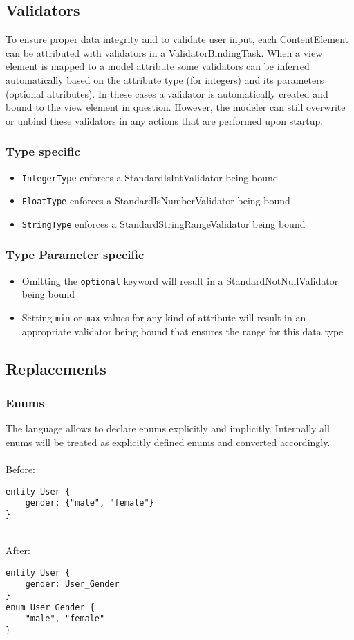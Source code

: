 \subsection{Validators}
To ensure proper data integrity and to validate user input, each ContentElement can be attributed with validators in a ValidatorBindingTask. When a view element is mapped to a model attribute some validators can be inferred automatically based on the attribute type (\eg for integers) and its parameters (\eg optional attributes). In these cases a validator is automatically created and bound to the view element in question. However, the modeler can still overwrite or unbind these validators in any actions that are performed upon startup.

\subsubsection{Type specific}
\begin{itemize}
\item \lstinline!IntegerType! enforces a StandardIsIntValidator being bound
\item \lstinline!FloatType! enforces a StandardIsNumberValidator being bound
\item \lstinline!StringType! enforces a StandardStringRangeValidator being bound
\end{itemize}

\subsubsection{Type Parameter specific}

\begin{itemize}
\item Omitting the \lstinline!optional! keyword will result in a StandardNotNullValidator being bound
\item Setting \lstinline!min! or \lstinline!max! values for any kind of attribute will result in an appropriate validator being bound that ensures the range for this data type
\end{itemize}

\subsection{Replacements}
\subsubsection{Enums}
The \MD language allows to declare enums explicitly and implicitly. Internally all enums will be treated as explicitly defined enums and converted accordingly. \\ \\
Before:
\begin{lstlisting}[language=MD2]
entity User {
	gender: {"male", "female"}
}
\end{lstlisting}
~
\\
After:
\begin{lstlisting}[language=MD2]
entity User {
	gender: User_Gender
}
enum User_Gender {
	"male", "female"
}
\end{lstlisting}


